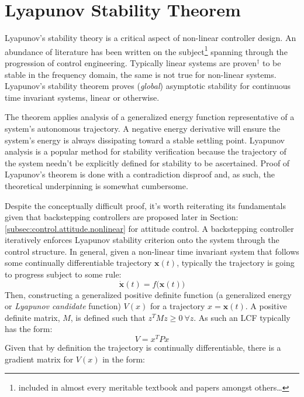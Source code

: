 \section{Lyapunov Stability Theorem}
\label{sec:control.lyapunov}
Lyapunov's stability theory is a critical aspect of non-linear controller design. An abundance of literature has been written on the subject\footnote{included in almost every meritable textbook and papers \cite{noteonlyapunov,nonlinearsystems} amongst others\ldots} spanning through the progression of control engineering. Typically linear systems are proven$^\dagger$ to be stable in the frequency domain, the same is not true for non-linear systems. Lyapunov's stability theorem proves (\emph{global}) asymptotic stability for continuous time invariant systems, linear or otherwise.
\par
The theorem applies analysis of a generalized energy function representative of a system's autonomous trajectory. A negative energy derivative will ensure the system's energy is always dissipating toward a stable settling point. Lyapunov analysis is a popular method for stability verification because the trajectory of the system needn't be explicitly defined for stability to be ascertained. Proof of Lyapunov's theorem is done with a contradiction disproof and, as such, the theoretical underpinning is somewhat cumbersome.
\par
Despite the conceptually difficult proof, it's worth reiterating its fundamentals given that backstepping controllers are proposed later in Section:\ref{subsec:control.attitude.nonlinear} for attitude control. A backstepping controller iteratively enforces Lyapunov stability criterion onto the system through the control structure. In general, given a non-linear time invariant system that follows some continually differentiable trajectory $\mathbf{x}(t)$, typically the trajectory is going to progress subject to some rule:
\begin{equation}
\dot{\mathbf{x}}(t)=f\big(\mathbf{x}(t)\big)
\end{equation}
Then, constructing a generalized positive definite function (a generalized energy or \emph{Lyapunov candidate} function) $V(x)$ for a trajectory $x=\mathbf{x}(t)$. A positive definite matrix, $M$, is defined such that $z^TMz\geq 0~\forall z$. As such an LCF typically has the form:
\begin{equation}
V=x^TPx
\end{equation}
Given that by definition the trajectory is continually differentiable, there is a gradient matrix for $V(x)$ in the form:
